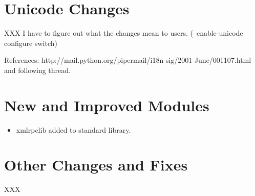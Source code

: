 \documentclass{howto}
\begin{document}





\section{Unicode Changes}

XXX I have to figure out what the changes mean to users.
(--enable-unicode configure switch)

References: http://mail.python.org/pipermail/i18n-sig/2001-June/001107.html  
and following thread.


\section{New and Improved Modules}

\begin{itemize}

  \item xmlrpclib added to standard library.

\end{itemize}


\section{Other Changes and Fixes}

XXX
\end{document}

